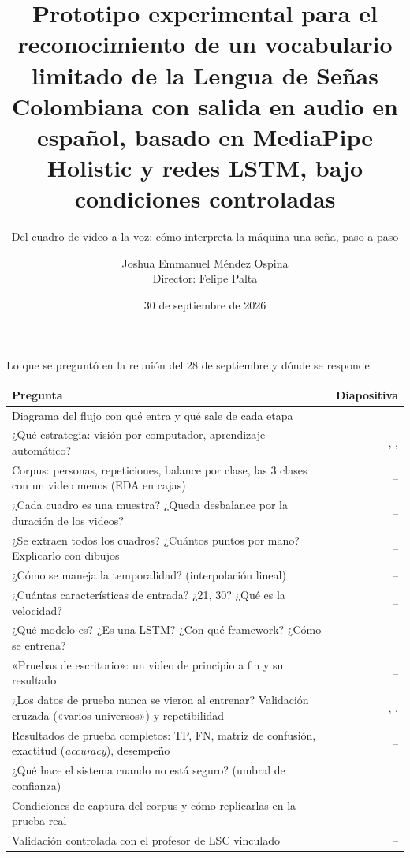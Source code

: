 \documentclass[aspectratio=169,10pt,xcolor={table}]{beamer}
\title[Del cuadro a la voz]{Prototipo experimental para el reconocimiento de un vocabulario limitado de la
Lengua de Señas Colombiana con salida en audio en español, basado en MediaPipe Holistic y redes LSTM, bajo
condiciones controladas}
\subtitle{Del cuadro de video a la voz: cómo interpreta la máquina una seña, paso a paso}
\author{Joshua Emmanuel Méndez Ospina\\[2pt]{\small Director: Felipe Palta}}
\institute{Ingeniería de Sistemas · Pontificia Universidad Javeriana Cali}
\date{30 de septiembre de 2026}
\begin{document}
\begin{frame}[plain]
  \titlepage
\end{frame}

\begin{frame}{Lo que se preguntó en la reunión del 28 de septiembre y dónde se responde}
\scriptsize
\renewcommand{\arraystretch}{1.08}
\begin{tabularx}{\textwidth}{@{}X r@{}}
\toprule
\textbf{Pregunta} & \textbf{Diapositiva} \\
\midrule
Diagrama del flujo con qué entra y qué sale de cada etapa & \pageref{fr:flujo} \\
¿Qué estrategia: visión por computador, aprendizaje automático? & \pageref{fr:flujo}, \pageref{fr:bloques}, \pageref{fr:porque} \\
Corpus: personas, repeticiones, balance por clase, las 3 clases con un video menos (EDA en cajas) & \pageref{fr:corpus}--\pageref{fr:balance} \\
¿Cada cuadro es una muestra? ¿Queda desbalance por la duración de los videos? & \pageref{fr:muestra}--\pageref{fr:cuadros} \\
¿Se extraen todos los cuadros? ¿Cuántos puntos por mano? Explicarlo con dibujos & \pageref{fr:puntos}--\pageref{fr:norm} \\
¿Cómo se maneja la temporalidad? (interpolación lineal) & \pageref{fr:tempo1}--\pageref{fr:tempo2} \\
¿Cuántas características de entrada? ¿21, 30? ¿Qué es la velocidad? & \pageref{fr:252}--\pageref{fr:matriz} \\
¿Qué modelo es? ¿Es una LSTM? ¿Con qué framework? ¿Cómo se entrena? & \pageref{fr:red}--\pageref{fr:curvas} \\
«Pruebas de escritorio»: un video de principio a fin y su resultado & \pageref{fr:escritorio}--\pageref{fr:proto} \\
¿Los datos de prueba nunca se vieron al entrenar? Validación cruzada («varios universos») y repetibilidad & \pageref{fr:particion}, \pageref{fr:esquemas}, \pageref{fr:conocidas} \\
Resultados de prueba completos: TP, FN, matriz de confusión, exactitud (\emph{accuracy}), desempeño & \pageref{fr:esquemas}--\pageref{fr:latencia} \\
¿Qué hace el sistema cuando no está seguro? (umbral de confianza) & \pageref{fr:umbral} \\
Condiciones de captura del corpus y cómo replicarlas en la prueba real & \pageref{fr:condiciones} \\
Validación controlada con el profesor de LSC vinculado & \pageref{fr:estado}--\pageref{fr:decisiones} \\
\bottomrule
\end{tabularx}
\end{frame}
\end{document}
